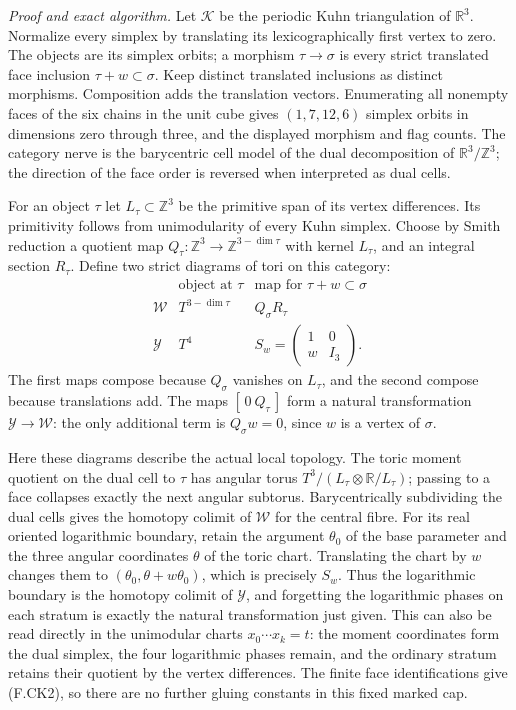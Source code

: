 \emph{Proof and exact algorithm.}
Let $\mathcal K$ be the periodic Kuhn triangulation of
$\mathbb R^3$.  Normalize every simplex by translating its
lexicographically first vertex to zero.  The objects are its
simplex orbits; a morphism $\tau\to\sigma$ is every strict
translated face inclusion $\tau+w\subset\sigma$.
Keep distinct translated inclusions as distinct morphisms.
Composition adds the translation vectors.  Enumerating all
nonempty faces of the six chains in the unit cube gives
$(1,7,12,6)$ simplex orbits in dimensions zero through three,
and the displayed morphism and flag counts.  The category
nerve is the barycentric cell model of the dual decomposition
of $\mathbb R^3/\mathbb Z^3$; the direction of the face order
is reversed when interpreted as dual cells.

For an object $\tau$ let $L_\tau\subset\mathbb Z^3$ be the
primitive span of its vertex differences.  Its primitivity
follows from unimodularity of every Kuhn simplex.  Choose by
Smith reduction a quotient map
$Q_\tau:\mathbb Z^3\to\mathbb Z^{3-\dim\tau}$ with kernel
$L_\tau$, and an integral section $R_\tau$.
Define two strict diagrams of tori on this category:
\[
\begin{array}{c|c|c}
 &\text{object at }\tau&\text{map for }\tau+w\subset\sigma\\\hline
\mathcal W&T^{3-\dim\tau}&Q_\sigma R_\tau\\
\mathcal Y&T^4&S_w=\begin{pmatrix}1&0\\ w&I_3\end{pmatrix}.
\end{array}                                                \tag{F.CK2}
\]
The first maps compose because $Q_\sigma$ vanishes on
$L_\tau$, and the second compose because translations add.
The maps $[\,0\ Q_\tau\,]$ form a natural transformation
$\mathcal Y\to\mathcal W$: the only additional term is
$Q_\sigma w=0$, since $w$ is a vertex of $\sigma$.

Here these diagrams describe the actual local topology.
The toric moment quotient on the dual cell to $\tau$ has
angular torus $T^3/(L_\tau\otimes\mathbb R/L_\tau)$;
passing to a face collapses exactly the next angular
subtorus.  Barycentrically subdividing the dual cells gives
the homotopy colimit of $\mathcal W$ for the central fibre.
For its real oriented logarithmic boundary, retain the
argument $\theta_0$ of the base parameter and the three
angular coordinates $\theta$ of the toric chart.  Translating
the chart by $w$ changes them to
$(\theta_0,\theta+w\theta_0)$, which is precisely $S_w$.
Thus the logarithmic boundary is the homotopy colimit of
$\mathcal Y$, and forgetting the logarithmic phases on each
stratum is exactly the natural transformation just given.
This can also be read directly in the unimodular charts
$x_0\cdots x_k=t$: the moment coordinates form the dual
simplex, the four logarithmic phases remain, and the ordinary
stratum retains their quotient by the vertex differences.
The finite face identifications give (F.CK2), so there are
no further gluing constants in this fixed marked cap.

